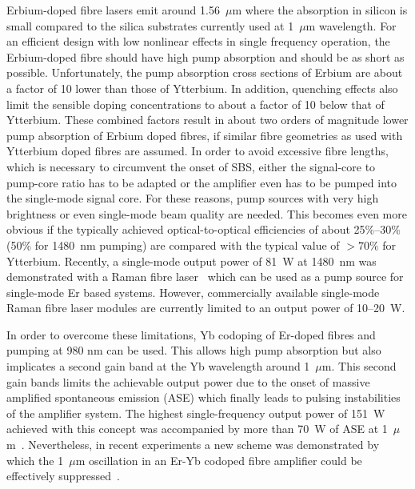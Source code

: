 Erbium-doped fibre lasers emit around 1.56~$\mu$m where the absorption in silicon is small compared to the silica substrates currently used at 1~$\mu$m wavelength. For an efficient design with low nonlinear effects in single frequency operation, the Erbium-doped fibre should have high pump absorption and should be as short as possible. Unfortunately, the pump absorption cross sections of Erbium are about a factor of 10 lower than those of Ytterbium. In addition, quenching effects also limit the sensible doping concentrations to about a factor of 10 below that of Ytterbium. These combined factors result in about two orders of magnitude lower pump absorption of Erbium doped fibres, if similar fibre geometries as used with Ytterbium doped fibres are assumed. In order to avoid excessive fibre lengths, which is necessary to circumvent the onset of SBS, either the signal-core to pump-core ratio has to be adapted or the amplifier even has to be pumped into the single-mode signal core. For these reasons, pump sources with very high brightness or even single-mode beam quality are needed. This becomes even more obvious if the typically achieved optical-to-optical efficiencies of about 25\%--30\% (50\% for 1480~nm pumping) are compared with the typical value of ${}>70\%$ for Ytterbium. Recently, a single-mode output power of 81~W at 1480~nm was demonstrated with a Raman fibre laser~\cite{Nicholson2010} which can be used as a pump source for single-mode Er based systems. However, commercially available single-mode Raman fibre laser modules are currently limited to an output power of 10--20~W.

In order to overcome these limitations, Yb codoping of Er-doped fibres and pumping at 980 nm can be used. This allows high pump absorption but also implicates a second gain band at the Yb wavelength around 1~$\mu$m. This second gain bands limits the achievable output power due to the onset of massive amplified spontaneous emission (ASE) which finally leads to pulsing instabilities of the amplifier system. The highest single-frequency output power of 151~W achieved with this concept was accompanied by more than 70~W of ASE at 1~$\mu$m~\cite{Jeong2005}. Nevertheless, in recent experiments a new scheme was demonstrated by which the 1~$\mu$m oscillation in an Er-Yb codoped fibre amplifier could be effectively suppressed~\cite{Kuhn2009}.

